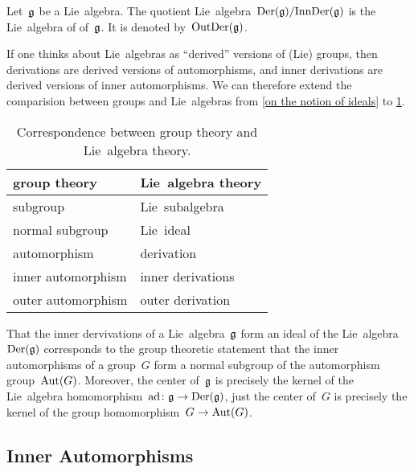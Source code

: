 \begin{definition}
	Let~$\mathfrak{g}$ be a Lie~algebra.
	The quotient Lie~algebra~$\operatorname{Der}(\mathfrak{g}) / {\operatorname{InnDer}(\mathfrak{g})}$ is the Lie~algebra of  of~$\mathfrak{g}$.
	It is denoted by~$\operatorname{OutDer}(\mathfrak{g})$.
\end{definition}


\begin{remark}
	If one thinks about Lie~algebras as \enquote{derived} versions of (Lie) groups, then derivations are derived versions of automorphisms, and inner derivations are derived versions of inner automorphisms.
	We can therefore extend the comparision between groups and Lie~algebras from \cref{on the notion of ideals} to \cref{correspondence between groups and lie algebras}.
	\begin{table}
		\centering
		\begin{tabular}{ll}
			\toprule
			group theory
			&
			Lie~algebra theory
			\\
			\midrule
			subgroup
			&
			Lie~subalgebra
			\\
			normal subgroup
			&
			Lie~ideal
			\\
			automorphism
			&
			derivation
			\\
			inner automorphism
			&
			inner derivations
			\\
			outer automorphism
			&
			outer derivation
			\\
			\bottomrule
		\end{tabular}
		\caption{Correspondence between group theory and Lie~algebra theory.}
		\label{correspondence between groups and lie algebras}
	\end{table}

	That the inner dervivations of a Lie~algebra~$\mathfrak{g}$ form an ideal of the Lie~algebra~$\operatorname{Der}(\mathfrak{g})$ corresponds to the group theoretic statement that the inner automorphisms of a group~$G$ form a normal subgroup of the automorphism group~$\operatorname{Aut}(G)$.
	Moreover, the center of~$\mathfrak{g}$ is precisely the kernel of the Lie~algebra homomorphism~$\ad \colon \glie \to \Der(\glie)$, just the center of~$G$ is precisely the kernel of the group homomorphism~$G \to \Aut(G)$.
\end{remark}



\subsection{Inner Automorphisms}


